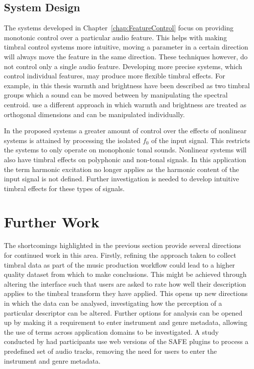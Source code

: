 	\subsection{System Design}
	\label{sec:Conclusion-Critique-SystemDesign}
		The systems developed in Chapter~\ref{chap:FeatureControl} focus on providing monotonic control over a
		particular audio feature. This helps with making timbral control systems more intuitive, moving a parameter
		in a certain direction will always move the feature in the same direction. These techniques however, do not
		control only a single audio feature. Developing more precise systems, which control individual features, may
		produce more flexible timbral effects. For example, in this thesis warmth and brightness have been described
		as two timbral groups which a sound can be moved between by manipulating the spectral centroid.
		\cite{zacharakis2011an} use a different approach in which warmth and brightness are treated as orthogonal
		dimensions and can be manipulated individually.

		In the proposed systems a greater amount of control over the effects of nonlinear systems is attained by
		processing the isolated $f_{0}$ of the input signal. This restricts the systems to only operate on
		monophonic tonal sounds. Nonlinear systems will also have timbral effects on polyphonic and non-tonal
		signals. In this application the term harmonic excitation no longer applies as the harmonic content of the
		input signal is not defined. Further investigation is needed to develop intuitive timbral effects for these
		types of signals.

\section{Further Work}
\label{sec:Conclusion-FurtherWork}
	The shortcomings highlighted in the previous section provide several directions for continued work in this area.
	Firstly, refining the approach taken to collect timbral data as part of the music production workflow could lead to
	a higher quality dataset from which to make conclusions. This might be achieved through altering the interface such
	that users are asked to rate how well their description applies to the timbral transform they have applied. This
	opens up new directions in which the data can be analysed, investigating how the perception of a particular
	descriptor can be altered. Further options for analysis can be opened up by making it a requirement to enter
	instrument and genre metadata, allowing the use of terms across application domains to be investigated. A study
	conducted by \citet{stasis2017audio} had participants use web versions of the SAFE plugins to process a predefined
	set of audio tracks, removing the need for users to enter the instrument and genre metadata.

